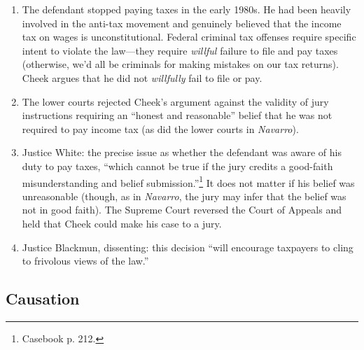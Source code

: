 \begin{enumerate}
    \item The defendant stopped paying taxes in the early 1980s. He had been 
    heavily involved in the anti-tax movement and genuinely believed that the 
    income tax on wages is unconstitutional. Federal criminal tax offenses 
    require specific intent to violate the law---they require \emph{willful} 
    failure to file and pay taxes (otherwise, we'd all be criminals for making 
    mistakes on our tax returns). Cheek argues that he did not 
    \emph{willfully} fail to file or pay.
    \item The lower courts rejected Cheek's argument against the validity of 
    jury instructions requiring an ``honest and reasonable'' belief that he 
    was not required to pay income tax (as did the lower courts in 
    \emph{Navarro}).
    \item Justice White: the precise issue as whether the defendant was aware 
    of his duty to pay taxes, ``which cannot be true if the jury credits a 
    good-faith misunderstanding and belief submission.''\footnote{Casebook p. 
    212.} It does not matter if his belief was unreasonable (though, as in 
    \emph{Navarro}, the jury may infer that the belief was not in good faith). 
    The Supreme Court reversed the Court of Appeals and held that Cheek could 
    make his case to a jury.
    \item Justice Blackmun, dissenting: this decision ``will encourage 
    taxpayers to cling to frivolous views of the law.''
\end{enumerate}

\subsection{Causation}

